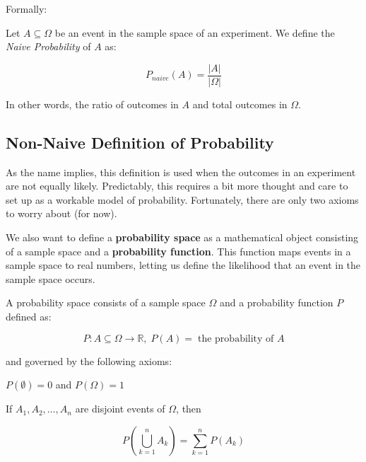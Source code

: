 \documentclass{standalone}
\begin{document}
Formally:

\begin{definition}
  Let $A \subseteq \Omega$ be an event in the sample space of an experiment. We
  define the \emph{Naive Probability} of $A$ as:

  \[
    P_{naive}(A) = \frac {|A|} {|\Omega|}
  \]

  In other words, the ratio of outcomes in $A$ and total outcomes in $\Omega$.
\end{definition}

\subsection{Non-Naive Definition of Probability}

As the name implies, this definition is used when the outcomes in an experiment
are not equally likely. Predictably, this requires a bit more thought and care
to set up as a workable model of probability. Fortunately, there are only two
axioms to worry about (for now).

We also want to define a \textbf{probability space} as a mathematical object
consisting of a sample space and a \textbf{probability function}. This function
maps events in a sample space to real numbers, letting us define the likelihood
that an event in the sample space occurs.

\begin{definition}
  A probability space consists of a sample space $\Omega$ and a probability
  function $P$ defined as:

  \[
    P : A \subseteq \Omega \to \mathbb{R}, \; P(A) = \; \text{the probability
    of $A$}
  \]

  and governed by the following axioms:

  \begin{axiom}
    $P(\emptyset) = 0$ and $P(\Omega) = 1$
  \end{axiom}

  \begin{axiom}
    If $A_1, A_2, \dots, A_n$ are disjoint events of $\Omega$, then

    \[
      P(\bigcup_{k=1}^n A_k) = \sum_{k=1}^n P(A_k)
    \]
  \end{axiom}
\end{definition}
\end{document}
